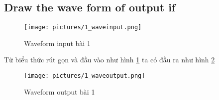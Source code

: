     \subsection{Draw the wave form of output if}
        \begin{figure}[H]
            \centering
            \texttt{[image: pictures/1\_waveinput.png]}
            \caption{Waveform input bài 1}
            \label{fig:1_waveinput}
        \end{figure}
        \hspace*{0.6cm}Từ biểu thức rút gọn và đầu vào như hình \ref{fig:1_waveinput} ta có đầu ra như hình \ref{fig:1_waveoutput}
        \begin{figure}[H]
            \centering
            \texttt{[image: pictures/1\_waveoutput.png]}
            \caption{Waveform output bài 1}
            \label{fig:1_waveoutput}
        \end{figure}
        